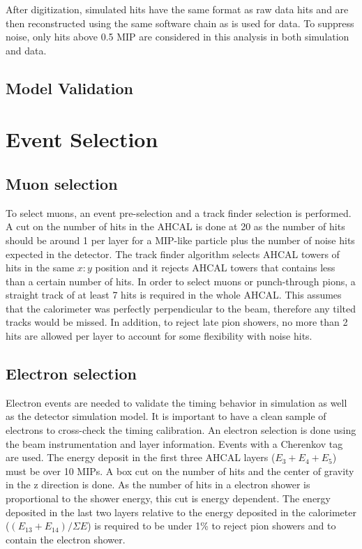 After digitization, simulated hits have the same format as raw data hits and are then reconstructed using the same software chain as is used for data. To suppress noise, only hits above 0.5 MIP are considered in this analysis in both simulation and data.

\subsection{Model Validation}

\section{Event Selection}

\subsection{Muon selection}

To select muons, an event pre-selection and a track finder \cite{} selection is performed. A cut on the number of hits in the AHCAL is done at 20 as the number of hits should be around 1 per layer for a MIP-like particle plus the number of noise hits expected in the detector. The track finder algorithm selects AHCAL towers of hits in the same $x:y$ position and it rejects AHCAL towers that contains less than a certain number of hits. In order to select muons or punch-through pions, a straight track of at least 7 hits is required in the whole AHCAL. This assumes that the calorimeter was perfectly perpendicular to the beam, therefore any tilted tracks would be missed. In addition, to reject late pion showers, no more than 2 hits are allowed per layer to account for some flexibility with noise hits.

\subsection{Electron selection}

Electron events are needed to validate the timing behavior in simulation as well as the detector simulation model. It is important to have a clean sample of electrons to cross-check the timing calibration. An electron selection is done using the beam instrumentation and layer information. Events with a Cherenkov tag are used. The energy deposit in the first three AHCAL layers ($E_3+E_4+E_5$) must be over 10 MIPs. A box cut on the number of hits and the center of gravity in the z direction is done. As the number of hits in a electron shower is proportional to the shower energy, this cut is energy dependent. The energy deposited in the last two layers relative to the energy deposited in the calorimeter ($(E_{13}+E_{14})/\Sigma E$) is required to be under 1\% to reject pion showers and to contain the electron shower.

